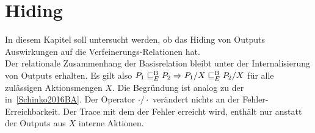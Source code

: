 \section{Hiding}

In diesem Kapitel soll untersucht werden, ob das Hiding von Outputs
Auswirkungen auf die Verfeinerungs-Relationen \ERel{} hat.\\
Der relationale Zusammenhang der Basisrelation \EBRel{} bleibt unter der
Internalisierung von Outputs erhalten. Es gilt also $P_1 \sqsubseteq  _E^\mathrm{B} P_2 \Rightarrow
P_1/X \sqsubseteq  _E^\mathrm{B} P_2/X$ für alle zulässigen Aktionsmengen $X$. Die Begründung ist
analog zu der in~\ref{Schinko2016BA}. Der Operator $\cdot /\cdot$ verändert
nichts an der Fehler-Erreichbarkeit. Der Trace mit dem der Fehler erreicht
wird, enthält nur anstatt der Outputs aus $X$ interne Aktionen.

